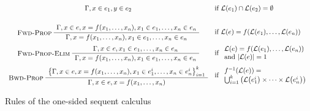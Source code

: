 \begin{table}
\begin{gather*}
\begin{array}{cl}
      {\seqq{x \in e_1, y \in e_2}}
      &
        \text{if~} \lang{e_1} \cap \lang{e_2} = \emptyset
      \\[4ex]
      \infer[Fwd-Prop]
      {\seqq{x = f(x_1, \ldots, x_n), x_1 \in e_1, \ldots, x_n \in e_n}}
      {\seqq{x \in e, x = f(x_1, \ldots, x_n), x_1 \in e_1, \ldots, x_n \in e_n}}
      &
        \text{if~} \lang{e} = f(\lang{e_1}, \ldots, \lang{e_n})
      \\[3ex]
      \infer[Fwd-Prop-Elim]
      {\seqq{x = f(x_1, \ldots, x_n), x_1 \in e_1, \ldots, x_n \in e_n}}
      {\seqq{x \in e, x_1 \in e_1, \ldots, x_n \in e_n}}
      &
        \text{if~}
        \begin{array}{l}
          \lang{e} = f(\lang{e_1}, \ldots, \lang{e_n})
          \\
          \text{and~} 
          |\lang{e}|= 1
          \end{array}
      \\[3ex]
      \infer[Bwd-Prop]
      {\seqq{x \in e, x = f(x_1, \ldots, x_n)}}
      {\big\{\seqq{x \in e, x = f(x_1, \ldots, x_n),
      x_1 \in e_1^i, \ldots, x_n \in e_n^i}\big\}_{i=1}^k}
      &
        \text{if~}
        \begin{array}{l}
          f^{-1}(\lang{e}) = \\
          \bigcup_{i=1}^k \big( \lang{e_1^i} \times \cdots \times \lang{e_n^i} \big)
          \end{array}
    \end{array}
  \end{gather*}
  
  \caption{Rules of the one-sided sequent calculus}
\end{table}


